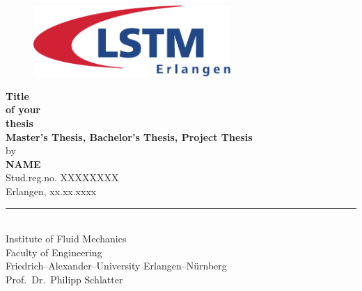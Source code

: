 \documentclass[
 	11pt,                 				%
  	notitlepage,          				%
  	twoside, 			   				%
 	bibliography=totoc,
  	listof=totoc,
  	headsepline,         				%
  	footsepline,         				%
  cleardoublepage=empty,				%
  numbers=noenddot,
]{scrreprt}
\begin{document}
%


\pagestyle{empty}






\begin{titlepage}
	\begin{center}


\begin{figure}[htbp]
	\centering
		\includegraphics[width=75mm]{bilder/LSTM_Logo.pdf} 		
\end{figure}
		\ifenglish
		\vspace{25mm}
		 		
		\LARGE {\textbf{Title \\ of your \\ thesis}}\\ [25mm]
		\huge {\textbf{Master's Thesis, Bachelor's Thesis, Project Thesis}} \\ [14mm]
		 by \\ [2mm]
		\LARGE \textbf{NAME}\\[5mm]
		\LARGE Stud.reg.no. XXXXXXXX\\[5mm]
		\LARGE Erlangen, xx.xx.xxxx\\
		\vfill
		\rule{15cm}{0.02mm}\\
		\Large Institute of Fluid Mechanics\\
		Faculty of Engineering\\
		Friedrich--Alexander--University Erlangen--N\"urnberg\\
		Prof.\ Dr.\ Philipp Schlatter\\
		\else
		
		\vspace{25mm}
		

\end{center}
\end{titlepage}
\end{document}
